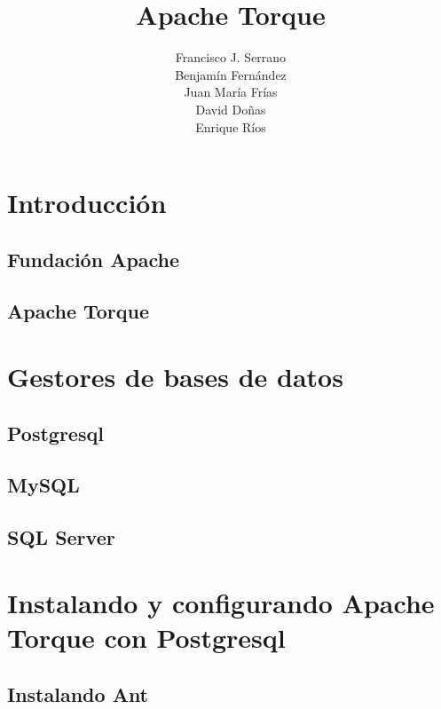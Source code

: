 \documentclass[12pt, oneside]{article}
\title{Apache Torque}
\author{
	Francisco J. Serrano\\
	Benjamín Fernández\\
	Juan María Frías\\
	David Doñas\\
	Enrique Ríos
}
\begin{document}
\begin{titlepage}
	\maketitle
\end{titlepage}

\tableofcontents
\newpage

\section{Introducción}
	\subsection{Fundación Apache}
		

	\subsection{Apache Torque}
		

\section{Gestores de bases de datos}

	\subsection{Postgresql}
		

	\subsection{MySQL}
		
	
	\subsection{SQL Server}
		

\section{Instalando y configurando Apache Torque con Postgresql}
	

	\subsection{Instalando Ant}
		
\end{document}
